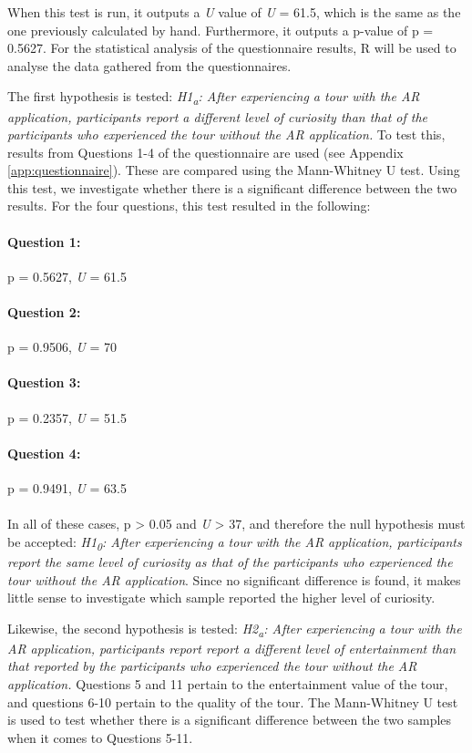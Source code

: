 When this test is run, it outputs a \textit{U} value of \textit{U} = 61.5, which is the same as the one previously calculated by hand. Furthermore, it outputs a p-value of p = 0.5627. For the statistical analysis of the questionnaire results, R will be used to analyse the data gathered from the questionnaires.
 
The first hypothesis is tested: \textit{H1\textsubscript{a}: After experiencing a tour with the AR application, participants report a different level of curiosity than that of the participants who experienced the tour without the AR application.} To test this, results from Questions 1-4 of the questionnaire are used (see Appendix \ref{app:questionnaire}). These are compared using the Mann-Whitney U test. Using this test, we investigate whether there is a significant difference between the two results. For the four questions, this test resulted in the following:

\paragraph{Question 1:} p = 0.5627, \textit{U} = 61.5
\paragraph{Question 2:} p = 0.9506, \textit{U} = 70
\paragraph{Question 3:} p = 0.2357, \textit{U} = 51.5
\paragraph{Question 4:} p = 0.9491, \textit{U} = 63.5\\
\\
In all of these cases, p > 0.05 and \textit{U} > 37, and therefore the null hypothesis must be accepted: \textit{H1\textsubscript{0}: After experiencing a tour with the AR application, participants report the same level of curiosity as that of the participants who experienced the tour without the AR application}. Since no significant difference is found, it makes little sense to investigate which sample reported the higher level of curiosity.

Likewise, the second hypothesis is tested: \textit{H2\textsubscript{a}: After experiencing a tour with the AR application, participants report report a different level of entertainment than that reported by the participants who experienced the tour without the AR application.} Questions 5 and 11 pertain to the entertainment value of the tour, and questions 6-10 pertain to the quality of the tour. The Mann-Whitney U test is used to test whether there is a significant difference between the two samples when it comes to Questions 5-11.\pagebreak

